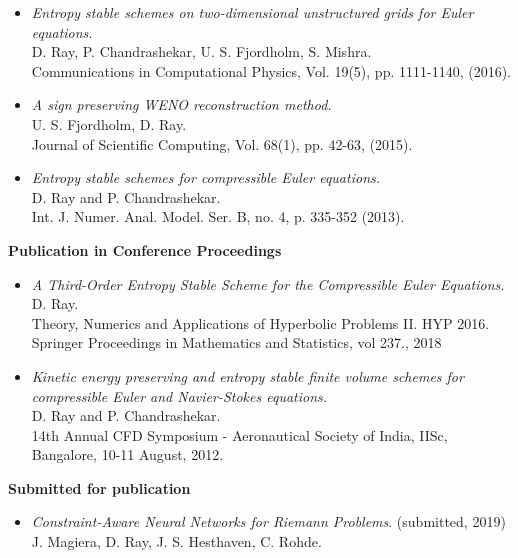 \documentclass[margin]{res}
\begin{document}
\begin{resume}
\begin{itemize}
              \item {\it Entropy stable schemes on two-dimensional unstructured grids for Euler equations.}\\
              D. Ray, P. Chandrashekar, U. S. Fjordholm, S. Mishra. \\
              Communications in Computational Physics, Vol. 19(5), pp. 1111-1140, (2016).
            
              \item {\it A sign preserving WENO reconstruction method.}\\
              U. S. Fjordholm, D. Ray. \\
              Journal of Scientific Computing, Vol. 68(1), pp. 42-63, (2015).
             
              \item {\it Entropy stable schemes for compressible Euler equations.}\\
              D. Ray and P. Chandrashekar.\\
              Int. J. Numer. Anal. Model. Ser. B, no. 4, p. 335-352 (2013).
             \end{itemize}



\textbf{Publication in Conference Proceedings}                
            \begin{itemize}           
              \item {\it A Third-Order Entropy Stable Scheme for the Compressible Euler Equations.}\\
              D. Ray.\\
              Theory, Numerics and Applications of Hyperbolic Problems II. HYP 2016. Springer Proceedings in Mathematics and Statistics, vol 237., 2018

              \item {\it Kinetic energy preserving and entropy stable finite volume schemes for compressible Euler and Navier-Stokes equations.}\\
              D. Ray and P. Chandrashekar.\\
              14th Annual CFD Symposium - Aeronautical Society of India, IISc, Bangalore, 10-11 August, 2012.
             \end{itemize}

\textbf{Submitted for publication}                
            \begin{itemize}           
              
              \item {\it Constraint-Aware Neural Networks for Riemann Problems}. (submitted, 2019) \\
               J. Magiera, D. Ray, J. S. Hesthaven, C. Rohde.
               

\end{itemize}
\end{resume}
\end{document}
